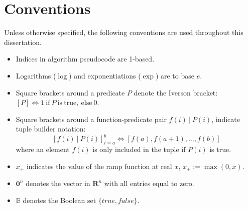 \chapter*{Conventions}
Unless otherwise specified, the following conventions are used throughout this dissertation.

\begin{itemize}
  \item Indices in algorithm pseudocode are 1-based.
  \item Logarithms ($\log$) and exponentiations ($\exp$) are to base $e$.
  \item Square brackets around a predicate $P$ denote the Iverson bracket: $\left[P\right] \Leftrightarrow 1\ \mathrm{if}\ P \mathrm{~is~true,~else}\ 0$.
  \item Square brackets around a function-predicate pair $f(i)~|~P(i)$, indicate tuple builder notation: 
  \[
  \left[f(i)~|~P(i)\right]_{i=a}^b \Leftrightarrow \left[ f(a), f(a+1), \dots, f(b) \right]
  \]
  where an element $f(i)$ is only included in the tuple if $P(i)$ is true.
  \item $x_+$ indicates the value of the ramp function at real $x$, $x_+ := \max(0, x)$.
  \item $\mathbf{0}^n$ denotes the vector in $\mathbf{R}^n$ with all entries equal to zero.
  \item $\mathbb{B}$ denotes the Boolean set $\{true, false\}$.
\end{itemize}
